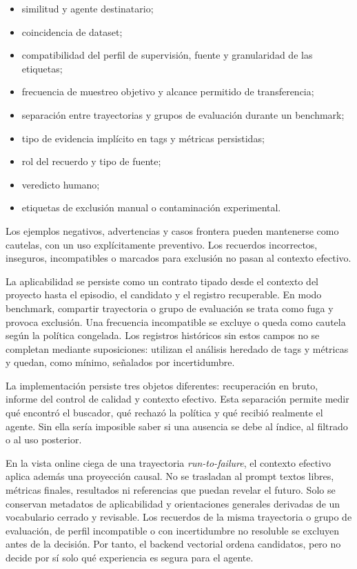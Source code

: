 \begin{itemize}
  \item similitud y agente destinatario;
  \item coincidencia de dataset;
  \item compatibilidad del perfil de supervisión, fuente y granularidad de las
        etiquetas;
  \item frecuencia de muestreo objetivo y alcance permitido de transferencia;
  \item separación entre trayectorias y grupos de evaluación durante un
        benchmark;
  \item tipo de evidencia implícito en tags y métricas persistidas;
  \item rol del recuerdo y tipo de fuente;
  \item veredicto humano;
  \item etiquetas de exclusión manual o contaminación experimental.
\end{itemize}

Los ejemplos negativos, advertencias y casos frontera pueden mantenerse como
cautelas, con un uso explícitamente preventivo. Los recuerdos incorrectos,
inseguros, incompatibles o marcados para exclusión no pasan al contexto
efectivo.

La aplicabilidad se persiste como un contrato tipado desde el contexto del
proyecto hasta el episodio, el candidato y el registro recuperable. En modo
benchmark, compartir trayectoria o grupo de evaluación se trata como fuga y
provoca exclusión. Una frecuencia incompatible se excluye o queda como cautela
según la política congelada. Los registros históricos sin estos campos no se
completan mediante suposiciones: utilizan el análisis heredado de tags y
métricas y quedan, como mínimo, señalados por incertidumbre.

La implementación persiste tres objetos diferentes: recuperación en bruto,
informe del control de calidad y contexto efectivo. Esta separación permite
medir qué encontró el buscador, qué rechazó la política y qué recibió realmente
el agente. Sin ella sería imposible saber si una ausencia se debe al índice, al
filtrado o al uso posterior.

En la vista online ciega de una trayectoria \textit{run-to-failure}, el contexto
efectivo aplica además una proyección causal. No se trasladan al prompt textos
libres, métricas finales, resultados ni referencias que puedan revelar el
futuro. Solo se conservan metadatos de aplicabilidad y orientaciones generales
derivadas de un vocabulario cerrado y revisable. Los recuerdos de la misma
trayectoria o grupo de evaluación, de perfil incompatible o con incertidumbre
no resoluble se excluyen antes de la decisión. Por tanto, el backend vectorial
ordena candidatos, pero no decide por sí solo qué experiencia es segura para el
agente.

